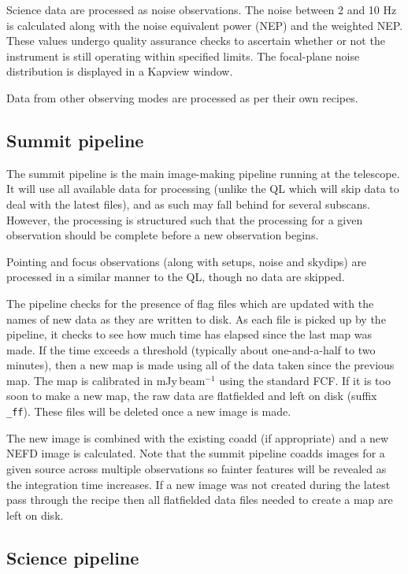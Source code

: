 \documentclass[twoside,11pt,nolof]{starlink}
\begin{document}
Science data are processed as noise observations. The noise between 2
and 10 Hz is calculated along with the noise equivalent power (NEP)
and the weighted NEP. These values undergo quality assurance checks to
ascertain whether or not the instrument is still operating within
specified limits. The focal-plane noise distribution is displayed in a
Kapview window.

Data from other observing modes are processed as per their own recipes.

\subsection{Summit pipeline}

The summit pipeline is the main image-making pipeline running at the
telescope. It will use all available data for processing (unlike the
QL which will skip data to deal with the latest files), and as such
may fall behind for several subscans. However, the processing is
structured such that the processing for a given observation should be
complete before a new observation begins.

Pointing and focus observations (along with setups, noise and skydips)
are processed in a similar manner to the QL, though no data are
skipped.

The pipeline checks for the presence of flag files which are updated
with the names of new data as they are written to disk. As each file
is picked up by the pipeline, it checks to see how much time has
elapsed since the last map was made. If the time exceeds a threshold
(typically about one-and-a-half to two minutes), then a new map is
made using all of the data taken since the previous map. The map is
calibrated in mJy\,beam$^{-1}$ using the standard FCF. If it is too
soon to make a new map, the raw data are flatfielded and left on disk
(suffix \verb+_ff+). These files will be deleted once a new image is
made.

The new image is combined with the existing coadd (if appropriate) and
a new NEFD image is calculated. Note that the summit pipeline coadds
images for a given source across multiple observations so fainter
features will be revealed as the integration time increases. If a new
image was not created during the latest pass through the recipe then
all flatfielded data files needed to create a map are left on disk.

\subsection{Science pipeline}
\end{document}
